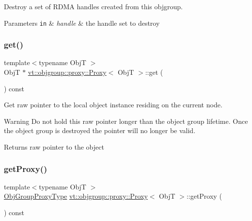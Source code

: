 Destroy a set of R\+D\+MA handles created from this objgroup. 


\begin{DoxyParams}[1]{Parameters}
\mbox{\tt in}  & {\em handle} & the handle set to destroy \\
\hline
\end{DoxyParams}
\mbox{\label{structvt_1_1objgroup_1_1proxy_1_1_proxy_a62eef779c097c8398e249827e4ad7c6a}} 
\subsubsection{\texorpdfstring{get()}{get()}}
{\footnotesize\ttfamily template$<$typename ObjT $>$ \\
ObjT $\ast$ \hyperlink{structvt_1_1objgroup_1_1proxy_1_1_proxy}{vt\+::objgroup\+::proxy\+::\+Proxy}$<$ ObjT $>$\+::get (\begin{DoxyParamCaption}{ }\end{DoxyParamCaption}) const}



Get raw pointer to the local object instance residing on the current node. 

\begin{DoxyWarning}{Warning}
Do not hold this raw pointer longer than the object group lifetime. Once the object group is destroyed the pointer will no longer be valid.
\end{DoxyWarning}
\begin{DoxyReturn}{Returns}
raw pointer to the object 
\end{DoxyReturn}
\mbox{\label{structvt_1_1objgroup_1_1proxy_1_1_proxy_a76cda2351cf7801abe2ebffa1403c5b8}} 
\subsubsection{\texorpdfstring{get\+Proxy()}{getProxy()}}
{\footnotesize\ttfamily template$<$typename ObjT $>$ \\
\hyperlink{namespacevt_ad7cae989df485fccca57f0792a880a8e}{Obj\+Group\+Proxy\+Type} \hyperlink{structvt_1_1objgroup_1_1proxy_1_1_proxy}{vt\+::objgroup\+::proxy\+::\+Proxy}$<$ ObjT $>$\+::get\+Proxy (\begin{DoxyParamCaption}{ }\end{DoxyParamCaption}) const}



